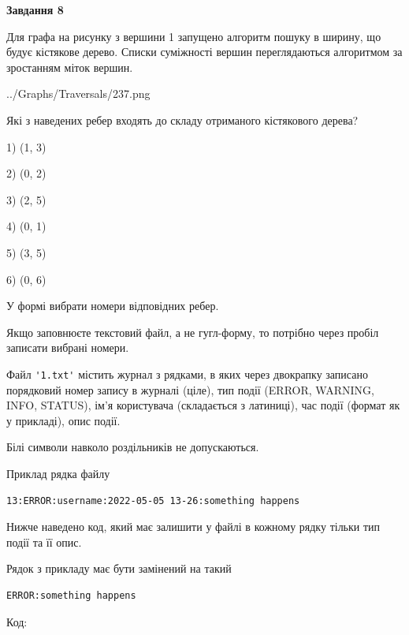 \documentclass[12pt, ukrainian]{article}
\def\code#1{\Verb!#1!}
\begin{document}
{\begin {large}
{\begin {center}\textbf{Завдання 8}\end {center}}\par
Для графа на рисунку з вершини 1 запущено алгоритм пошуку в ширину, що будує кістякове дерево. Списки суміжності вершин переглядаються алгоритмом за зростанням міток вершин.\par
\begin{center}
	{../Graphs/Traversals/237.png}
\end{center}
\par Які з наведених ребер входять до складу отриманого кістякового дерева?\par
1) (1, 3)\par
2) (0, 2)\par
3) (2, 5)\par
4) (0, 1)\par
5) (3, 5)\par
6) (0, 6)\par
{\vskip 15pt} У формі вибрати номери відповідних ребер.


Якщо заповнюєте текстовий файл, а не гугл-форму, то потрібно через пробіл записа\-ти вибрані номери.\par
\newpage


Файл \code{'1.txt'} містить журнал з рядками, в яких через двокрапку записано поряд\-ко\-вий номер запису в журналі (ціле), тип події (ERROR, WARNING, INFO, STATUS), ім'я користувача (складається з латиниці), час події (фор\-мат як у прикладі), опис події.

Білі символи навколо роздільників не допускаються.

Приклад рядка файлу



\begin{verbatim}
13:ERROR:username:2022-05-05 13-26:something happens
\end{verbatim}


Нижче наведено код, який має залишити у файлі в кожному рядку тільки тип події та її опис.

Рядок з прикладу має бути замінений на такий



\begin{verbatim}
ERROR:something happens
\end{verbatim}




Код:




\end{large}}
\end{document}
